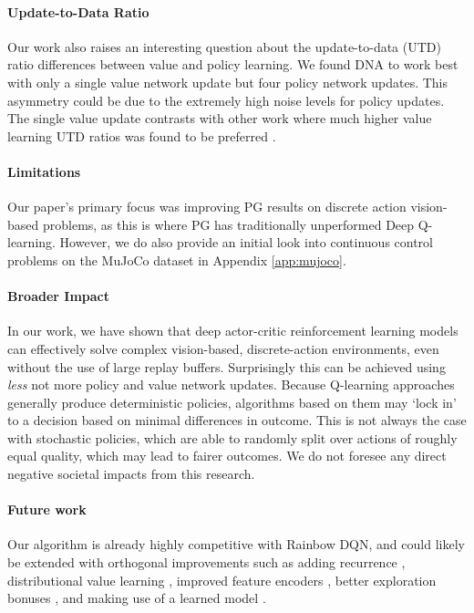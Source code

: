 \documentclass{article}
\begin{document}
\paragraph{Update-to-Data Ratio}
\label{sec:update_ratio}

Our work also raises an interesting question about the update-to-data (UTD) ratio differences between value and policy learning. We found DNA to work best with only a single value network update but four policy network updates. This asymmetry could be due to the extremely high noise levels for policy updates. The single value update contrasts with other work where much higher value learning UTD ratios was found to be preferred \cite{aitchison2019optimal, chen2021randomized}.



\paragraph{Limitations}

Our paper's primary focus was improving PG results on discrete action vision-based problems, as this is where PG has traditionally unperformed Deep Q-learning. However, we do also provide an initial look into continuous control problems on the MuJoCo \cite{todorov2012mujoco} dataset in Appendix \ref{app:mujoco}.

\paragraph{Broader Impact}

In our work, we have shown that deep actor-critic reinforcement learning models can effectively solve complex vision-based, discrete-action environments, even without the use of large replay buffers. Surprisingly this can be achieved using \textit{less} not more policy and value network updates. Because Q-learning approaches generally produce deterministic policies, algorithms based on them may `lock in' to a decision based on minimal differences in outcome. This is not always the case with stochastic policies, which are able to randomly split over actions of roughly equal quality, which may lead to fairer outcomes. We do not foresee any direct negative societal impacts from this research. 

\paragraph{Future work} Our algorithm is already highly competitive with Rainbow DQN, and could likely be extended with orthogonal improvements such as adding recurrence \cite{hausknecht2015deep}, distributional value learning \cite{bellemare2017distributional}, improved feature encoders \cite{espeholt2018impala}, better exploration bonuses \cite{burda2018exploration}, and making use of a learned model \cite{schrittwieser2020mastering}. 
\end{document}

